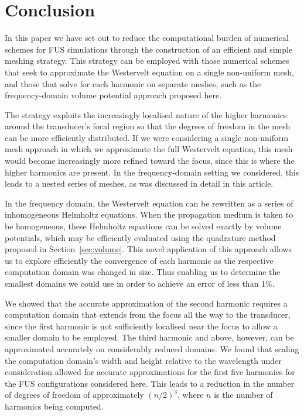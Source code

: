 \documentclass[11pt]{article}
\numberwithin{equation}{section}
\newcommand{\red}[1]{{\color{black} #1}}
\begin{document}
\section{\label{sec:conclusion}Conclusion}
In this paper we have set out to reduce the computational burden of numerical 
schemes for \red{FUS} simulations through the construction of an efficient and simple 
meshing strategy. This strategy can be employed with those numerical schemes that 
\red{seek to approximate the Westervelt equation on a single non-uniform mesh}, and those that solve 
for each harmonic on separate meshes, such as the frequency-domain volume potential 
approach proposed here.

The strategy exploits the increasingly localised nature of the higher harmonics 
around the transducer's focal region so that the degrees of freedom in the mesh
can be more efficiently distributed. If we were considering a single non-uniform mesh approach 
\red{in which we approximate the full Westervelt equation}, this mesh would become 
increasingly more refined toward the focus, since this is where the higher 
harmonics are present. In the frequency-domain setting we considered, this leads to a nested 
series of meshes, as was discussed in detail in this article.

In the frequency domain, the Westervelt equation can be rewritten as a series 
of inhomogeneous Helmholtz equations. When the propagation medium is taken to be 
homogeneous, these Helmholtz equations can be solved exactly by volume potentials, 
which may be efficiently evaluated using the quadrature method proposed in 
Section~\ref{sec:volume}. This novel application of this approach allows us to 
explore efficiently the convergence of each harmonic as the respective computation 
domain was changed in size. Thus enabling us to determine the smallest domains 
we could use in order to achieve an error of less than 1\%.

We showed that the accurate approximation of the second harmonic requires a 
computation domain that extends from the focus all the way to the transducer, since 
the first harmonic is not sufficiently localised near the focus to allow a 
smaller domain to be employed. The third harmonic and above, however, can be 
approximated accurately on considerably reduced domains. We found that 
scaling the computation domain's width and height relative to the wavelength 
under consideration allowed for accurate approximations for the first five 
harmonics for the \red{FUS} configurations considered here. This leads to a reduction 
in the number of degrees of freedom of approximately $(n/2)^3$, where $n$ is 
the number of harmonics being computed.
\end{document}

